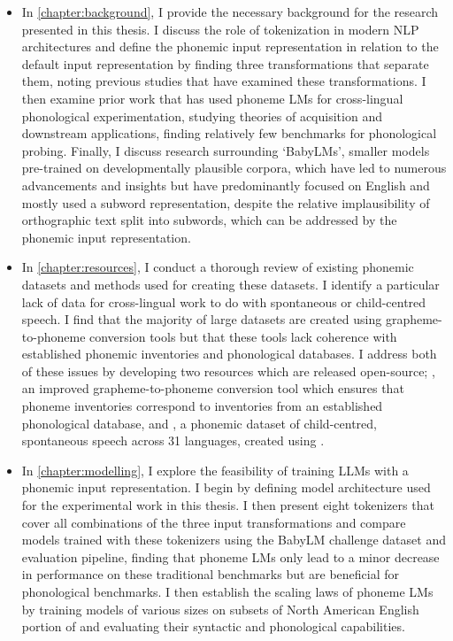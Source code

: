\begin{itemize}
    \item In \cref{chapter:background}, I provide the necessary background for the research presented in this thesis. I discuss the role of tokenization in modern NLP architectures and define the phonemic input representation in relation to the default input representation by finding three transformations that separate them, noting previous studies that have examined these transformations. I then examine prior work that has used phoneme LMs for cross-lingual phonological experimentation, studying theories of acquisition and downstream applications, finding relatively few benchmarks for phonological probing. Finally, I discuss research surrounding `BabyLMs', smaller models pre-trained on developmentally plausible corpora, which have led to numerous advancements and insights but have predominantly focused on English and mostly used a subword representation, despite the relative implausibility of orthographic text split into subwords, which can be addressed by the phonemic input representation.
    \item In \cref{chapter:resources}, I conduct a thorough review of existing phonemic datasets and methods used for creating these datasets. I identify a particular lack of data for cross-lingual work to do with spontaneous or child-centred speech. I find that the majority of large datasets are created using grapheme-to-phoneme conversion tools but that these tools lack coherence with established phonemic inventories and phonological databases. I address both of these issues by developing two resources which are released open-source; \gpp, an improved grapheme-to-phoneme conversion tool which ensures that phoneme inventories correspond to inventories from an established phonological database, and \ipachildes, a phonemic dataset of child-centred, spontaneous speech across 31 languages, created using \gpp.
    \item In \cref{chapter:modelling}, I explore the feasibility of training LLMs with a phonemic input representation. I begin by defining model architecture used for the experimental work in this thesis. I then present eight tokenizers that cover all combinations of the three input transformations and compare models trained with these tokenizers using the BabyLM challenge dataset and evaluation pipeline, finding that phoneme LMs only lead to a minor decrease in performance on these traditional benchmarks but are beneficial for phonological benchmarks. I then establish the scaling laws of phoneme LMs by training models of various sizes on subsets of North American English portion of \ipachildes and evaluating their syntactic and phonological capabilities.

\end{itemize}
